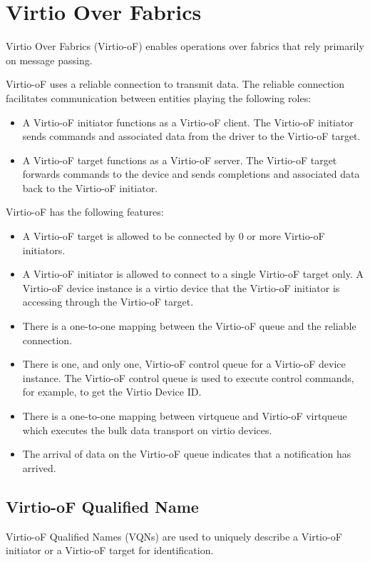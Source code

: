 \section{Virtio Over Fabrics}\label{sec:Virtio Transport Options / Virtio Over Fabrics}

Virtio Over Fabrics (Virtio-oF) enables operations over fabrics that rely
primarily on message passing.

Virtio-oF uses a reliable connection to transmit data. The reliable
connection facilitates communication between entities playing the following roles:

\begin{itemize}
\item A Virtio-oF initiator functions as a Virtio-oF client.
The Virtio-oF initiator sends commands and associated data from the driver
to the Virtio-oF target.
\item A Virtio-oF target functions as a Virtio-oF server.
The Virtio-oF target forwards commands to the device and sends completions
and associated data back to the Virtio-oF initiator.
\end{itemize}

Virtio-oF has the following features:

\begin{itemize}
\item A Virtio-oF target is allowed to be connected by 0 or more Virtio-oF initiators.
\item A Virtio-oF initiator is allowed to connect to a single Virtio-oF target only.
A Virtio-oF device instance is a virtio device that the Virtio-oF initiator is
accessing through the Virtio-oF target.
\item There is a one-to-one mapping between the Virtio-oF queue and the reliable connection.
\item There is one, and only one, Virtio-oF control queue for a Virtio-oF device instance.
The Virtio-oF control queue is used to execute control commands,
for example, to get the Virtio Device ID.
\item There is a one-to-one mapping between virtqueue and Virtio-oF virtqueue
which executes the bulk data transport on virtio devices.
\item The arrival of data on the Virtio-oF queue indicates that a notification has arrived.
\end{itemize}


\subsection{Virtio-oF Qualified Name}\label{sec:Virtio Transport Options / Virtio Over Fabrics / Virtio-oF Qualified Name}
Virtio-oF Qualified Names (VQNs) are used to uniquely describe a Virtio-oF initiator
or a Virtio-oF target for identification.

